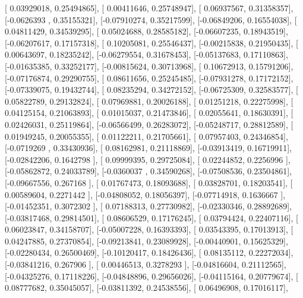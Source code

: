 \documentclass{article}
\begin{document}
       [ 0.03929018,  0.25494865],
       [ 0.00411646,  0.25748947],
       [ 0.06937567,  0.31358357],
       [-0.0626393 ,  0.35155321],
       [-0.07910274,  0.35217599],
       [-0.06849206,  0.16554038],
       [ 0.04811429,  0.34539295],
       [ 0.05024688,  0.28585182],
       [-0.06607235,  0.18943519],
       [-0.06207617,  0.17157318],
       [ 0.10205081,  0.25546437],
       [-0.00215838,  0.21950435],
       [ 0.00643697,  0.18235242],
       [-0.06279554,  0.31678453],
       [-0.05137683,  0.17110863],
       [-0.01635385,  0.33252177],
       [-0.00815624,  0.30713968],
       [ 0.10672913,  0.15791206],
       [-0.07176874,  0.29290755],
       [ 0.08611656,  0.25245485],
       [-0.07931278,  0.17172152],
       [-0.07339075,  0.19432744],
       [ 0.08235294,  0.34272152],
       [-0.06725309,  0.32583577],
       [ 0.05822789,  0.29132824],
       [ 0.07969881,  0.20026188],
       [ 0.01251218,  0.22275998],
       [ 0.04125154,  0.21063893],
       [ 0.01015037,  0.21473846],
       [ 0.02055641,  0.18630391],
       [ 0.02426031,  0.25119864],
       [-0.06566499,  0.26283072],
       [-0.05248717,  0.28812589],
       [ 0.01949245,  0.20055355],
       [ 0.01122211,  0.21705661],
       [ 0.07957403,  0.24346854],
       [-0.0719269 ,  0.33430936],
       [ 0.08162981,  0.21118869],
       [-0.03913419,  0.16719911],
       [-0.02842206,  0.1642798 ],
       [ 0.09999395,  0.29725084],
       [ 0.02244852,  0.2256996 ],
       [-0.05862872,  0.24033789],
       [-0.0360037 ,  0.34590268],
       [-0.07508536,  0.23504861],
       [-0.09667556,  0.267168  ],
       [ 0.01767473,  0.18093688],
       [ 0.03828701,  0.18203541],
       [ 0.00589604,  0.2271442 ],
       [-0.04808052,  0.18056397],
       [-0.07714918,  0.1636667 ],
       [-0.01452351,  0.3072302 ],
       [ 0.07188313,  0.27730982],
       [-0.02330346,  0.28892689],
       [-0.03817468,  0.29814501],
       [ 0.08606529,  0.17176245],
       [ 0.03794424,  0.22407116],
       [ 0.06023847,  0.34158707],
       [-0.05007228,  0.16393393],
       [ 0.03543395,  0.17013913],
       [ 0.04247885,  0.27370854],
       [-0.09213841,  0.23089928],
       [-0.00440901,  0.15625329],
       [-0.02280434,  0.26500469],
       [-0.10120417,  0.18426436],
       [ 0.08135112,  0.22272034],
       [-0.03841216,  0.267906  ],
       [ 0.00446513,  0.3278293 ],
       [-0.04816604,  0.21112565],
       [-0.04325276,  0.17118226],
       [-0.04848896,  0.29656026],
       [-0.04115164,  0.20779674],
       [ 0.08777682,  0.35045057],
       [-0.03811392,  0.24538556],
       [ 0.06496908,  0.17016117],
\end{document}
